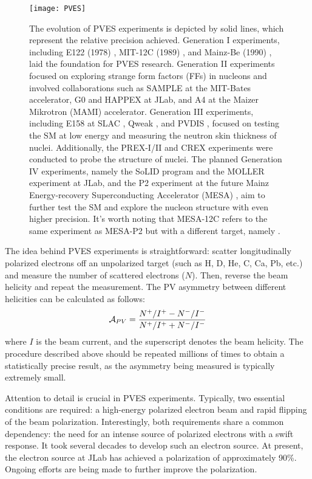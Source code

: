 \begin{figure}[!h]
    \centering
    \texttt{[image: PVES]}
    \caption[Evolution of PVES experiments.]
    { The evolution of PVES experiments is depicted by solid lines, which represent the relative precision achieved. Generation I experiments, including E122 (1978) \cite{PRESCOTT1978347}, MIT-12C (1989) \cite{PhysRevLett.65.694}, and Mainz-Be (1990) \cite{HEIL19891}, laid the foundation for PVES research. Generation II experiments focused on exploring strange form factors (FFs) in nucleons and involved collaborations such as SAMPLE \cite{SAMPLE} at the MIT-Bates accelerator, G0 \cite{G0} and HAPPEX \cite{HAPPEX} at JLab, and A4 \cite{A4} at the Maizer Mikrotron (MAMI) accelerator. Generation III experiments, including E158 at SLAC \cite{PhysRevLett.95.081601}, Qweak \cite{PhysRevLett.111.141803}, and PVDIS \cite{PhysRevLett.111.082501}, focused on testing the SM at low energy and measuring the neutron skin thickness of nuclei. Additionally, the PREX-I/II and CREX experiments were conducted to probe the structure of nuclei. The planned Generation IV experiments, namely the SoLID program \cite{SoLID} and the MOLLER experiment \cite{Moller-project} at JLab, and the P2 experiment at the future Mainz Energy-recovery Superconducting Accelerator (MESA) \cite{MESA-P2}, aim to further test the SM and explore the nucleon structure with even higher precision. It's worth noting that MESA-12C refers to the same experiment as MESA-P2 but with a different target, namely \Carbon.
    }
\end{figure}

The idea behind PVES experiments is straightforward: scatter longitudinally polarized electrons off an unpolarized target (such as H, D, He, C, Ca, Pb, etc.) and measure the number of scattered electrons ($N$). Then, reverse the beam helicity and repeat the measurement. The PV asymmetry between different helicities can be calculated as follows:
\begin{equation}
    \mathcal{A}_{PV} = \frac{N^+/I^+ - N^-/I^-}{N^+/I^+ + N^-/I^-}
\end{equation}
where $I$ is the beam current, and the superscript denotes the beam helicity. 
The procedure described above should be repeated millions of times to obtain a statistically precise result, as the asymmetry being measured is typically extremely small.

Attention to detail is crucial in PVES experiments. Typically, two essential conditions are required: a high-energy polarized electron beam and rapid flipping of the beam polarization. Interestingly, both requirements share a common dependency: the need for an intense source of polarized electrons with a swift response. It took several decades to develop such an electron source.
At present, the electron source at JLab has achieved a polarization of approximately 90\%. Ongoing efforts are being made to further improve the polarization.

